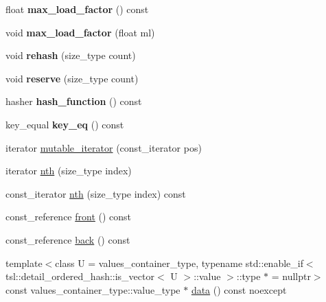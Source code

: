 \begin{DoxyCompactItemize}
\mbox{\label{classtsl_1_1ordered__set_adba63be49c8de3e2d799b2118bad8f71}} 
float {\bfseries max\+\_\+load\+\_\+factor} () const
\item 
\mbox{\label{classtsl_1_1ordered__set_abff78801e693da6fdbf73b617c16ec6e}} 
void {\bfseries max\+\_\+load\+\_\+factor} (float ml)
\item 
\mbox{\label{classtsl_1_1ordered__set_acc309424677397325af4476ac31e1500}} 
void {\bfseries rehash} (size\+\_\+type count)
\item 
\mbox{\label{classtsl_1_1ordered__set_ab9a62a8db59d69fb9b6f930c15427a0e}} 
void {\bfseries reserve} (size\+\_\+type count)
\item 
\mbox{\label{classtsl_1_1ordered__set_a7582155198c43ed0328394c589274a31}} 
hasher {\bfseries hash\+\_\+function} () const
\item 
\mbox{\label{classtsl_1_1ordered__set_a5efaa0821707a99f0601f59015e719ae}} 
key\+\_\+equal {\bfseries key\+\_\+eq} () const
\item 
iterator \mbox{\hyperlink{classtsl_1_1ordered__set_a7866c9d599658f12dba6b17fed1b671d}{mutable\+\_\+iterator}} (const\+\_\+iterator pos)
\item 
iterator \mbox{\hyperlink{classtsl_1_1ordered__set_adc4c67f752a07ced3348b0bc9a5afa3a}{nth}} (size\+\_\+type index)
\item 
const\+\_\+iterator \mbox{\hyperlink{classtsl_1_1ordered__set_aba2011ea9a10cc9f3e51fea95580abe1}{nth}} (size\+\_\+type index) const
\item 
const\+\_\+reference \mbox{\hyperlink{classtsl_1_1ordered__set_a6601e0f32a8a36628753bfcbc096be0f}{front}} () const
\item 
const\+\_\+reference \mbox{\hyperlink{classtsl_1_1ordered__set_ac182e91cae21e14dc0c2913779cf5368}{back}} () const
\item 
{\footnotesize template$<$class U  = values\+\_\+container\+\_\+type, typename std\+::enable\+\_\+if$<$ tsl\+::detail\+\_\+ordered\+\_\+hash\+::is\+\_\+vector$<$ U $>$\+::value $>$\+::type $\ast$  = nullptr$>$ }\\const values\+\_\+container\+\_\+type\+::value\+\_\+type $\ast$ \mbox{\hyperlink{classtsl_1_1ordered__set_a3ec9980b152c71a875fc4a4e1d7bb78c}{data}} () const noexcept

\end{DoxyCompactItemize}
